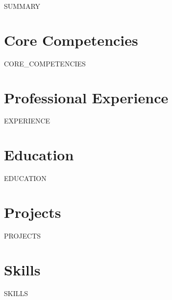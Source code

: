 \documentclass[11pt,a4paper,sans]{moderncv}
\begin{document}
\makecvtitle

\vspace{6pt}
\small{{{SUMMARY}}}

\section{Core Competencies}
\vspace{1pt}
{{CORE_COMPETENCIES}}

\section{Professional Experience}
\vspace{3pt}
{{EXPERIENCE}}

\section{Education}
\vspace{1pt}
{{EDUCATION}}

\section{Projects}
\vspace{1pt}
{{PROJECTS}}

\section{Skills}
\vspace{1pt}
{{SKILLS}}
\end{document}
